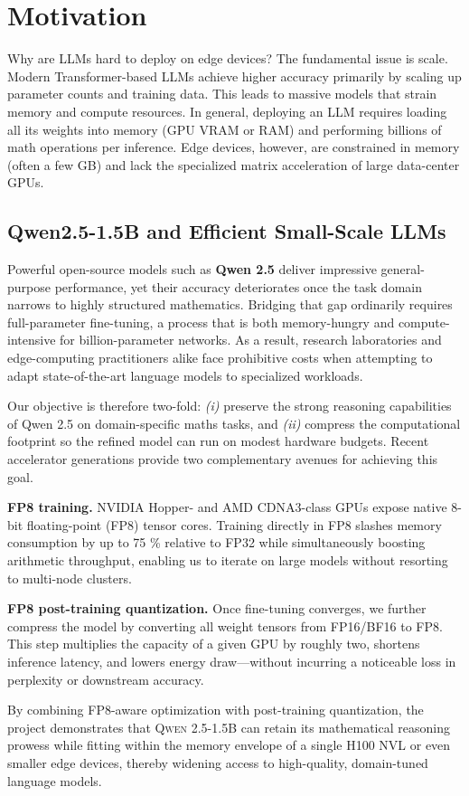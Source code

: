 \section{Motivation}\label{sec:motivation}

Why are LLMs hard to deploy on edge devices? The fundamental issue is scale. Modern Transformer-based LLMs achieve higher accuracy primarily by scaling up parameter counts and training data. This leads to massive models that strain memory and compute resources. In general, deploying an LLM requires loading all its weights into memory (GPU VRAM or RAM) and performing billions of math operations per inference. Edge devices, however, are constrained in memory (often a few GB) and lack the specialized matrix acceleration of large data-center GPUs.

\subsection{Qwen2.5-1.5B and Efficient Small-Scale LLMs}
Powerful open-source models such as \textbf{Qwen 2.5} deliver impressive general-purpose performance, yet their accuracy deteriorates once the task domain narrows to highly structured mathematics.  Bridging that gap ordinarily requires full-parameter fine-tuning, a process that is both memory-hungry and compute-intensive for billion-parameter networks.  As a result, research laboratories and edge-computing practitioners alike face prohibitive costs when attempting to adapt state-of-the-art language models to specialized workloads.

Our objective is therefore two-fold: \emph{(i)} preserve the strong reasoning capabilities of Qwen 2.5 on domain-specific maths tasks, and \emph{(ii)} compress the computational footprint so the refined model can run on modest hardware budgets.  Recent accelerator generations provide two complementary avenues for achieving this goal.

\textbf{FP8 training.}  
NVIDIA Hopper- and AMD CDNA3-class GPUs expose native 8-bit floating-point (FP8) tensor cores.  Training directly in FP8 slashes memory consumption by up to 75 \% relative to FP32 while simultaneously boosting arithmetic throughput, enabling us to iterate on large models without resorting to multi-node clusters.

\textbf{FP8 post-training quantization.}  
Once fine-tuning converges, we further compress the model by converting all weight tensors from FP16/BF16 to FP8.  This step multiplies the capacity of a given GPU by roughly two, shortens inference latency, and lowers energy draw—without incurring a noticeable loss in perplexity or downstream accuracy.

By combining FP8-aware optimization with post-training quantization, the project demonstrates that \textsc{Qwen 2.5-1.5B} can retain its mathematical reasoning prowess while fitting within the memory envelope of a single H100 NVL or even smaller edge devices, thereby widening access to high-quality, domain-tuned language models.
